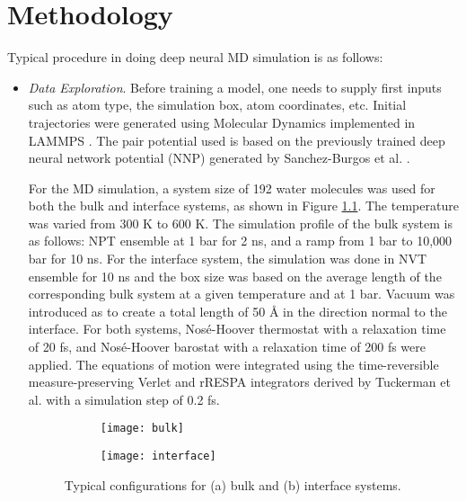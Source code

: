 \chapter{Methodology}
Typical procedure in doing deep neural MD simulation is as follows:

\begin{itemize}
    \item \emph{Data Exploration}. Before training a model, one needs to supply
          first inputs such as	atom type, the simulation box, atom
          coordinates, etc.	 Initial trajectories were generated
          using Molecular Dynamics implemented in
          LAMMPS \cite{LAMMPS}. The pair potential used is based on the
          previously
          trained deep neural network potential (NNP) generated by
          Sanchez-Burgos et
          al.
          \cite{sanchez2023deep}.

          For the MD simulation, a system size of 192 water molecules was used
          for both
          the bulk and interface systems, as shown in Figure
          \ref{fig:cryst_sctruct}. The
          temperature was varied from 300 K to 600 K. The simulation profile of
          the bulk
          system is as follows: NPT ensemble at 1 bar for 2 ns, and a ramp from
          1 bar to
          10,000 bar for 10 ns. For the interface system, the simulation was
          done in
          NVT
          ensemble for 10 ns and the box size was based on the average length
          of the
          corresponding bulk system at a given temperature and at 1 bar. Vacuum
          was
          introduced as to create a total length of 50 \r{A} in the direction
          normal to
          the interface. For both systems,
          Nosé-Hoover thermostat  with a
          relaxation time of 20 fs, and  Nosé-Hoover barostat with a relaxation
          time of 200 fs were
          applied. The equations of motion were integrated
          using the time-reversible measure-preserving Verlet and rRESPA
          integrators derived by Tuckerman et al. \cite{Tuckerman2006} with a
          simulation step of 0.2 fs.

          \begin{figure}[tbhp]
              \centering
              \begin{subfigure}{0.42\textwidth}
                  \centering
                  \texttt{[image: bulk]}
                  \caption{}
              \end{subfigure}
              \begin{subfigure}{0.42\textwidth}
                  \centering
                  \texttt{[image: interface]}
                  \caption{}
              \end{subfigure}
              \hfill
              \caption{Typical configurations for (a) bulk and (b) interface
                  systems.}
              \label{fig:cryst_sctruct}
          \end{figure}


\end{itemize}
